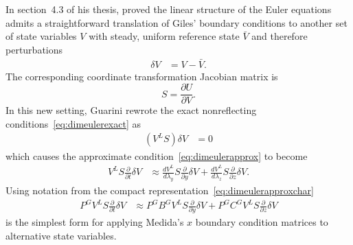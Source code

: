 \documentclass[letterpaper,11pt,nointlimits,reqno,draft]{amsbook}
\begin{document}
In section~4.3 of his thesis, \citet{Guarini1998} proved the linear
structure of the Euler equations admits a straightforward translation of Giles'
boundary conditions to another set of state variables $V$ with steady, uniform
reference state $\bar{V}$ and therefore perturbations
\begin{align}
  \label{eq:gilesperturbV}
  \delta{}V &= V - \bar{V}.
\end{align}
The corresponding coordinate transformation Jacobian matrix is
\[
   S = \frac{\partial{}U}{\partial{}V}
   .
\]
In this new setting, Guarini rewrote the exact nonreflecting
conditions~\eqref{eq:dimeulerexact} as
\begin{align}
  \left(V^L S\right) \delta{}V &= 0
\end{align}
which causes the approximate condition~\eqref{eq:dimeulerapprox} to become
\begin{align}
\label{eq:dimeulertransform}
  V^L
  S
  \frac{\partial}{\partial{}t}
  \delta{}V
  &\approx
  \frac{dV^L}{d\lambda_y}
  S
  \frac{\partial}{\partial{}y}
  \delta{}V
  +
  \frac{dV^L}{d\lambda_z}
  S
  \frac{\partial}{\partial{}z}
  \delta{}V
  .
\end{align}
Using notation from the compact representation~\eqref{eq:dimeulerapproxchar}
\begin{align}
\label{eq:dimeulertransformcharnot}
  P^G V^L S
  \frac{\partial}{\partial{}t}
  \delta{}V
  &\approx
  P^G B^G V^L S
  \frac{\partial}{\partial{}y}
  \delta{}V
  +
  P^G C^G V^L S
  \frac{\partial}{\partial{}z}
  \delta{}V
\end{align}
is the simplest form for applying Medida's $x$ boundary condition matrices to
alternative state variables.
\end{document}

